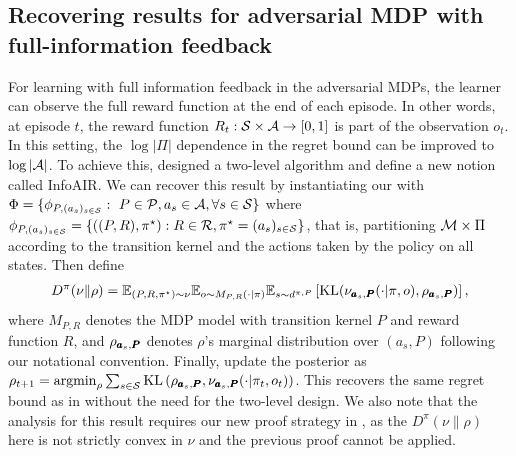 \subsection{Recovering results for adversarial MDP with full-information feedback \citep{liu2025decision}}  
For learning with full information feedback in the adversarial MDPs, the learner can observe the full reward function at the end of each episode. In other words, at episode $t$, the reward function $R_t: \mathcal{S}\times \mathcal{A}\to [0,1]$ is part of the observation $o_t$. In this setting, the $\log|\Pi|$ dependence in the regret bound can be improved to $\log|\mathcal{A}|$. To achieve this, \cite{liu2025decision} designed a two-level algorithm and define a new notion called InfoAIR. We can recover this result by instantiating our  with $\Phi=\{\phi_{P,(a_s)_{s\in\mathcal{S}}}:~ P\in\mathcal{P}, a_s \in\mathcal{A}, \forall s\in\mathcal{S}\}$ where $\phi_{P,(a_s)_{s\in\mathcal{S}}} = \{((P, R), \pi^\star): R\in\mathcal{R}, \pi^\star=(a_s)_{s\in\mathcal{S}}\}$, that is, partitioning $\mathcal{M}\times \Pi$ according to the transition kernel and the actions taken by the policy on all states.  
Then define 
\begin{align*}
   D^\pi(\nu\| \rho) = \mathbb{E}_{(P,R,\pi^\star) \sim \nu}\mathbb{E}_{o \sim M_{P,R}(\cdot|\pi)}\mathbb{E}_{s \sim d^{\pi, P}}\left[\text{KL}(\nu_{\pmb{a}_s, \pmb{P}}(\cdot|\pi, o), \rho_{\pmb{a}_s, \pmb{P}})\right], 
\end{align*}
where $M_{P, R}$ denotes the MDP model with transition kernel $P$ and reward function $R$, and $\rho_{\pmb{a}_s, \pmb{P}}$ denotes $\rho$'s marginal distribution over $(a_s, P)$ following our notational convention. Finally, update the posterior as 
$\rho_{t+1} = \operatorname*{argmin}_{\rho}\sum_{s \in \mathcal{S}}\text{KL}\left(\rho_{\pmb{a}_s, \pmb{P}}, \nu_{\pmb{a}_s, \pmb{P}}(\cdot|\pi_t, o_t)\right)$. This recovers the same regret bound as in \cite{liu2025decision} without the need for the two-level design. %
We also note that the analysis for this result requires our new proof strategy in , as the $D^\pi(\nu\|\rho)$ here is not strictly convex in $\nu$ and the previous proof \cite{xu2023bayesian, liu2025decision} cannot be applied. %




